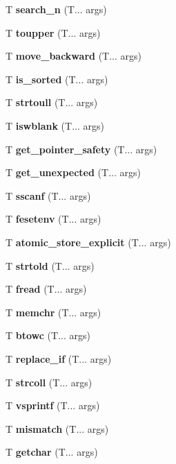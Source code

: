\begin{DoxyCompactItemize}
\mbox{\label{search_n}} 
T \textbf{ search\+\_\+n} (T... args)
\item 
\mbox{\label{toupper}} 
T \textbf{ toupper} (T... args)
\item 
\mbox{\label{move_backward}} 
T \textbf{ move\+\_\+backward} (T... args)
\item 
\mbox{\label{is_sorted}} 
T \textbf{ is\+\_\+sorted} (T... args)
\item 
\mbox{\label{strtoul}} 
T \textbf{ strtoull} (T... args)
\item 
\mbox{\label{iswblank}} 
T \textbf{ iswblank} (T... args)
\item 
\mbox{\label{get_pointer_safety}} 
T \textbf{ get\+\_\+pointer\+\_\+safety} (T... args)
\item 
\mbox{\label{get_unexpected}} 
T \textbf{ get\+\_\+unexpected} (T... args)
\item 
\mbox{\label{fscanf}} 
T \textbf{ sscanf} (T... args)
\item 
\mbox{\label{feenv}} 
T \textbf{ fesetenv} (T... args)
\item 
\mbox{\label{atomic_store}} 
T \textbf{ atomic\+\_\+store\+\_\+explicit} (T... args)
\item 
\mbox{\label{strtof}} 
T \textbf{ strtold} (T... args)
\item 
\mbox{\label{fread}} 
T \textbf{ fread} (T... args)
\item 
\mbox{\label{memchr}} 
T \textbf{ memchr} (T... args)
\item 
\mbox{\label{btowc}} 
T \textbf{ btowc} (T... args)
\item 
\mbox{\label{replace}} 
T \textbf{ replace\+\_\+if} (T... args)
\item 
\mbox{\label{strcoll}} 
T \textbf{ strcoll} (T... args)
\item 
\mbox{\label{vfprintf}} 
T \textbf{ vsprintf} (T... args)
\item 
\mbox{\label{mismatch}} 
T \textbf{ mismatch} (T... args)
\item 
\mbox{\label{getchar}} 
T \textbf{ getchar} (T... args)
\item 

\end{DoxyCompactItemize}
